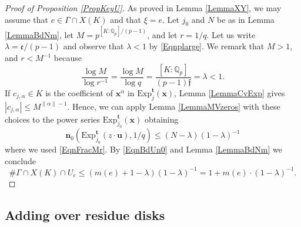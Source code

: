 \documentclass[11pt]{amsart}
\theoremstyle{remark}
\numberwithin{equation}{section}
\newcommand{\efrak}{\mathfrak{e}}
\newcommand{\ffrak}{\mathfrak{f}}
\newcommand{\Q}{\mathbb{Q}}
\newcommand{\nn}{\mathbf{n}}
\newcommand{\xx}{\mathbf{x}}
\newcommand{\ttt}{\mathbf{t}}
\newcommand{\uu}{\mathbf{u}}
\newcommand{\Exp}{\mathrm{Exp}}
\begin{document}
\begin{proof}[Proof of Proposition \ref{PropKeyU}] As proved in Lemma \ref{LemmaXY}, we may assume that $e\in \Gamma\cap X(K)$ and that $\xi=e$. Let $j_0$ and $N$ be as in Lemma \ref{LemmaBdNm}, let $M=p^{[K:\Q_p]/(p-1)}$, and let $r=1/q$. Let us write $\lambda=\efrak/(p-1)$ and observe that $\lambda<1$ by \eqref{Eqnplarge}. We remark that $M>1$, and $r<M^{-1}$ because
\begin{equation}\label{EqnFracMr}
\frac{\log M}{\log r^{-1}} =\frac{\log M}{\log q} = \frac{[K:\Q_p]}{(p-1)\ffrak} = \lambda<1.
\end{equation}
If $c_{j,\alpha}\in K$ is the coefficient of $\xx^\alpha$ in $\Exp^\ttt_{j}(\xx)$, Lemma \ref{LemmaCvExp} gives $|c_{j,\alpha}| \le M^{\| \alpha\|-1}$. Hence, we can apply Lemma \ref{LemmaMVzeros} with these choices to the power series $\Exp^\ttt_{j_0}(\xx)$ obtaining
$$
\nn_0(\Exp_{j_0}^\ttt(z\cdot \uu), 1/q)\le \left(N-\lambda\right)\left(1-\lambda\right)^{-1}
$$
where we used \eqref{EqnFracMr}. By \eqref{EqnBdUn0} and Lemma \ref{LemmaBdNm} we conclude
$$
\# \Gamma\cap X(K)\cap U_e \le  \left(m(e)+1-\lambda\right)\left(1-\lambda\right)^{-1}=1+ m(e)\cdot \left(1-\lambda\right)^{-1}.
$$
\end{proof}



\subsection{Adding over residue disks} 
\end{document}
